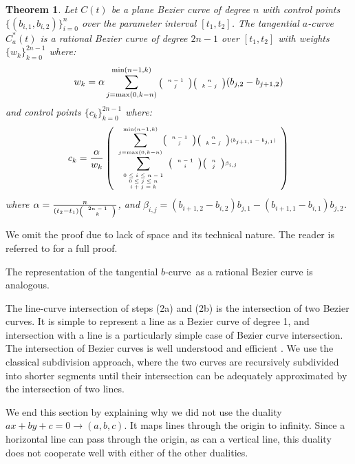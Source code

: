 \documentclass[twocolumn,10pt]{article}
\newcommand{\prf}{\noindent{{\bf Proof}:\ \ \ }}
\newcommand{\QED}{\vrule height 1.4ex width 1.0ex depth -.1ex\ \vspace{.2in}} %
\newcommand{\tinychoice}[2]{\mbox{\tiny{$\left( \begin{array}{c} #1 \\ #2 \end{array} \right)$}}}
\newcommand{\atang}{tangential $a$-curve\ }
\newcommand{\btang}{tangential $b$-curve\ }
\newtheorem{theorem}{Theorem}[section]
\begin{document}
\begin{theorem}
\label{thm:rationalduala}
Let $C(t)$ be a plane Bezier curve of degree $n$ 
with control points $\{ (b_{i,1}, b_{i,2}) \}_{i=0}^n$ over the parameter interval $[t_1,t_2]$.
The \atang $C_a^*(t)$ is a rational Bezier curve of degree $2n-1$ 
over $[t_1,t_2]$ with weights $\{w_k\}_{k=0}^{2n-1}$ where: 
\begin{displaymath}
\scriptsize{
w_k = \alpha
\sum_{j=\mbox{max}(0,k-n)}^{\mbox{min}(n-1,k)} 
\tinychoice{n-1}{j} \tinychoice{n}{k-j} (b_{j,2} - b_{j+1,2})
}
\end{displaymath}
%
and control points $\{c_k\}_{k=0}^{2n-1}$ where:
\begin{displaymath}
\tiny{
c_k = \frac{\alpha}{w_k} 
\left(
\begin{array}{l}
	\displaystyle{\sum_{j=\mbox{\tiny{max}}(0,k-n)}^{\mbox{\tiny{min}}(n-1,k)}}
	\tinychoice{n-1}{j} \tinychoice{n}{k-j} (b_{j+1,1} - b_{j,1})\\
	\displaystyle{\sum_{\begin{array}{c} \mbox{\tiny{$0 \leq i \leq n-1$}} \\ 
			     \mbox{\tiny{$0 \leq j \leq n$}} \\ 
			     \mbox{\tiny{$i+j=k$}}
			     \end{array}}}
\tinychoice{n-1}{i} \tinychoice{n}{j} \beta_{i,j}
\end{array}
\right)
}
\end{displaymath}
where $\alpha = \tiny{\frac{n}{(t_2 - t_1) \tinychoice{2n-1}{k}}}$,
and $\beta_{i,j} = (b_{i+1,2} - b_{i,2}) b_{j,1} - (b_{i+1,1} - b_{i,1}) b_{j,2}$.
\end{theorem}
\prf
We omit the proof due to lack of space and its technical nature.
The reader is referred to \cite{jj00} for a full proof.
\QED

The representation of the \btang as a rational Bezier curve is analogous.

The line-curve intersection of steps (2a) and (2b) is the intersection
of two Bezier curves.
It is simple to represent a line as a Bezier curve of degree 1,
and intersection with a line is a particularly simple case of Bezier
curve intersection.
The intersection of Bezier curves is well understood and efficient \cite{sederberg86}.
We use the classical subdivision approach, where the two curves are recursively
subdivided into shorter segments until their intersection can be adequately
approximated by the intersection of two lines.

We end this section by explaining why we did not use the duality 
$ax+by+c=0 \rightarrow (a,b,c)$.
It maps lines through the origin to infinity.
Since a horizontal line can pass through the origin,
as can a vertical line, this duality does not cooperate well with either of
the other dualities.
\end{document}
